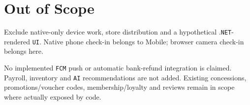 \clearpage
\section{Out of Scope}\label{sec:srs-24}
Exclude native-only device work, store distribution and a hypothetical .\texttt{NET}-rendered \texttt{UI}. Native phone check-in belongs to Mobile; browser camera check-in belongs here.

No implemented \texttt{FCM} push or automatic bank-refund integration is claimed. Payroll, inventory and \texttt{AI} recommendations are not added. Existing concessions, promotions/\allowbreak{}voucher codes, membership/\allowbreak{}loyalty and reviews remain in scope where actually exposed by code.

